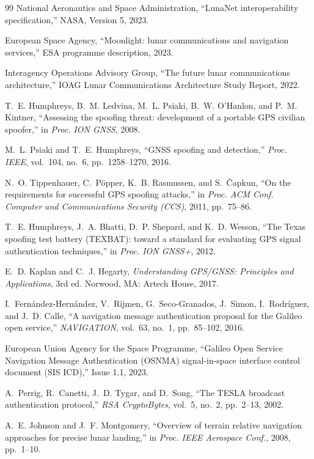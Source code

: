\documentclass[conference]{IEEEtran}
\begin{document}
\begin{thebibliography}{99}
 National Aeronautics and Space Administration, ``LunaNet
interoperability specification,'' NASA, Version 5, 2023.

 European Space Agency, ``Moonlight: lunar communications and
navigation services,'' ESA programme description, 2023.

 Interagency Operations Advisory Group, ``The future lunar
communications architecture,'' IOAG Lunar Communications Architecture Study Report,
2022.

 T.~E. Humphreys, B.~M. Ledvina, M.~L. Psiaki, B.~W. O'Hanlon,
and P.~M. Kintner, ``Assessing the spoofing threat: development of a portable GPS
civilian spoofer,'' in \emph{Proc. ION GNSS}, 2008.

 M.~L. Psiaki and T.~E. Humphreys, ``GNSS spoofing and detection,''
\emph{Proc. IEEE}, vol.~104, no.~6, pp.~1258--1270, 2016.

 N.~O. Tippenhauer, C.~P\"opper, K.~B. Rasmussen, and
S.~\v{C}apkun, ``On the requirements for successful GPS spoofing attacks,'' in
\emph{Proc. ACM Conf. Computer and Communications Security (CCS)}, 2011,
pp.~75--86.

 T.~E. Humphreys, J.~A. Bhatti, D.~P. Shepard, and K.~D. Wesson,
``The Texas spoofing test battery (TEXBAT): toward a standard for evaluating GPS
signal authentication techniques,'' in \emph{Proc. ION GNSS+}, 2012.

 E.~D. Kaplan and C.~J. Hegarty, \emph{Understanding GPS/GNSS:
Principles and Applications}, 3rd ed. Norwood, MA: Artech House, 2017.

 I.~Fern\'andez-Hern\'andez, V.~Rijmen, G.~Seco-Granados, J.~Simon,
I.~Rodr\'iguez, and J.~D. Calle, ``A navigation message authentication proposal for
the Galileo open service,'' \emph{NAVIGATION}, vol.~63, no.~1, pp.~85--102, 2016.

 European Union Agency for the Space Programme, ``Galileo Open
Service Navigation Message Authentication (OSNMA) signal-in-space interface control
document (SIS ICD),'' Issue 1.1, 2023.

 A.~Perrig, R.~Canetti, J.~D. Tygar, and D.~Song, ``The TESLA
broadcast authentication protocol,'' \emph{RSA CryptoBytes}, vol.~5, no.~2,
pp.~2--13, 2002.

 A.~E. Johnson and J.~F. Montgomery, ``Overview of terrain relative
navigation approaches for precise lunar landing,'' in \emph{Proc. IEEE Aerospace
Conf.}, 2008, pp.~1--10.


\end{thebibliography}
\end{document}
